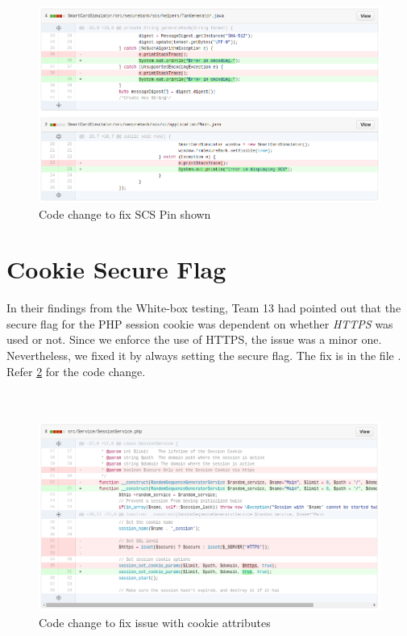 \begin{figure}[ht]
	\centering
	\includegraphics[width=.8\linewidth]{figures/fix_scs_pin_shown.png}
	\caption{Code change to fix SCS Pin shown}
	\label{fig:fix_scs_pin_shown}
\end{figure}

\clearpage 

\section{Cookie Secure Flag}
In their findings from the White-box testing, Team 13 had pointed out that the secure flag for the PHP session cookie was dependent on whether \textit{HTTPS} was used or not. Since we enforce the use of HTTPS, the issue was a minor one. Nevertheless, we fixed it by always setting the secure flag. The fix is in the file . Refer \ref{fig:fix_cookie_attributes} for the code change. \\ \\ \\

\begin{figure}[ht]
	\centering
	\includegraphics[width=.8\linewidth]{figures/fix_cookie_attributes.png}
	\caption{Code change to fix issue with cookie attributes}
	\label{fig:fix_cookie_attributes}
\end{figure}

